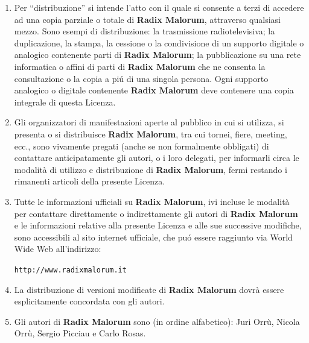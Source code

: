 \documentclass[10pt,italian,twocolumn,twoside,xdvi,openany,a4paper]{book}
\begin{document}
\begin{titlepage}
\begin{center}
\begin{minipage}[c]{16cm}
\begin{enumerate}
      \item Per ``distribuzione'' si intende l'atto con il quale si
      consente a terzi di accedere ad una copia parziale o totale di
      {\bf Radix Malorum}, attraverso qualsiasi mezzo. Sono esempi di
      distribuzione: la trasmissione radiotelevisiva; la duplicazione,
      la stampa, la cessione o la condivisione di un supporto digitale
      o analogico contenente parti di {\bf Radix Malorum}; la
      pubblicazione su una rete informatica o affini di parti di {\bf
      Radix Malorum} che ne consenta la consultazione o la copia a
      pi\'u di una singola persona. Ogni supporto analogico o digitale
      contenente {\bf Radix Malorum} deve contenere una copia
      integrale di questa Licenza.

      \item Gli organizzatori di manifestazioni aperte al pubblico in
      cui si utilizza, si presenta o si distribuisce {\bf Radix
      Malorum}, tra cui tornei, fiere, meeting, ecc., sono vivamente
      pregati (anche se non formalmente obbligati) di contattare
      anticipatamente gli autori, o i loro delegati, per informarli
      circa le modalit\`a di utilizzo e distribuzione di {\bf Radix
      Malorum}, fermi restando i rimanenti articoli della presente
      Licenza.

      \item Tutte le informazioni ufficiali su {\bf Radix Malorum},
      ivi incluse le modalit\`a per contattare direttamente o
      indirettamente gli autori di {\bf Radix Malorum} e le
      informazioni relative alla presente Licenza e alle sue
      successive modifiche, sono accessibili al sito internet
      ufficiale, che pu\'o essere raggiunto via World Wide Web
      all'indirizzo:

      {\tt http://www.radixmalorum.it}

      \item La distribuzione di versioni modificate di {\bf Radix
      Malorum} dovr\`a essere esplicitamente concordata con gli
      autori.

      \item Gli autori di {\bf Radix Malorum} sono (in ordine
      alfabetico): Juri Orr\`u, Nicola Orr\`u, Sergio Picciau e Carlo
      Rosas.

      \end{enumerate} 
\normalsize
\rm
\end{minipage} 
\end{center}
\end{titlepage}
\thispagestyle{empty}
\begin{titlepage}
  \vskip 8cm
\end{titlepage}
\addtocounter{page}{2}
\end{document}
